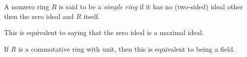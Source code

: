 \documentclass{article}
\begin{document}
A nonzero ring $R$ is said to be a {\it simple ring} if it has no (two-sided) ideal other then the zero ideal and $R$ itself.
\par
This is equivalent to saying that the zero ideal is a maximal ideal.
\par
If $R$ is a commutative ring with unit, then this is equivalent to being a field.
\end{document}

